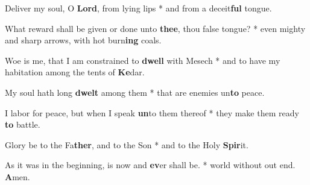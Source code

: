 \begin{multicols}{2}
	Deliver my soul, O \textbf{Lord}, from lying lips * and from a deceit\textbf{ful} tongue.
	
	What reward shall be given or done unto \textbf{thee}, thou false tongue? * even mighty and sharp arrows, with hot burn\textbf{ing} coals.
	
	Woe is me, that I am constrained to \textbf{dwell} with Mesech * and to have my habitation among the tents of \textbf{Ke}dar.
	
	My soul hath long \textbf{dwelt} among them * that are enemies un\textbf{to} peace.
	
	I labor for peace, but when I speak \textbf{un}to them thereof * they make them ready \textbf{to} battle.
	
	Glory be to the Fa\textbf{ther}, and to the Son * and to the Holy \textbf{Spir}it.
	
	As it was in the beginning, is now and \textbf{ev}er shall be. * world without out end. \textbf{A}men.
\end{multicols}